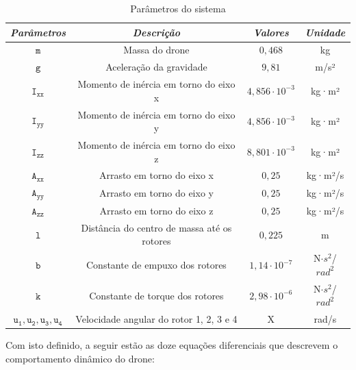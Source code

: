 \begin{center}
    \begin{longtable}{|c|c|c|c|} %
        \caption{Parâmetros do sistema} \vspace{-0.7cm}
        \label{tab:params}
        \hline
        \emph{Parâmetros} & \emph{Descrição} & \emph{Valores} & \emph{Unidade} \\
        \hline
        \endfirsthead
        \endhead

        $\mathtt{m}$ & Massa do drone & $0,468$ &kg \\ \hline
        $\mathtt{g}$ & Aceleração da gravidade & $9,81$ & m/s² \\ \hline
        $\mathtt{I_{xx}}$ & Momento de inércia em torno do eixo x & $4,856 \cdot 10^{-3}$ & kg·m² \\ \hline
        $\mathtt{I_{yy}}$ & Momento de inércia em torno do eixo y & $4,856 \cdot 10^{-3}$ & kg·m² \\ \hline
        $\mathtt{I_{zz}}$ & Momento de inércia em torno do eixo z & $8,801 \cdot 10^{-3}$ & kg·m² \\ \hline
        $\mathtt{A_{xx}}$ & Arrasto em torno do eixo x & $0,25$ & kg·m²/s \\ \hline
        $\mathtt{A_{yy}}$ & Arrasto em torno do eixo y & $0,25$ & kg·m²/s \\ \hline
        $\mathtt{A_{zz}}$ & Arrasto em torno do eixo z & $0,25$ & kg·m²/s \\ \hline
        $\mathtt{l}$ & Distância do centro de massa até os rotores & $0,225$ & m \\ \hline
        $\mathtt{b}$ & Constante de empuxo dos rotores & $1,14 \cdot 10^{-7}$ & N$\cdot s^{2}$/$rad^{2}$ \\ \hline
        $\mathtt{k}$ & Constante de torque dos rotores & $2,98 \cdot 10^{-6}$ & N$\cdot s^{2}$/$rad^{2}$ \\ \hline
        $\mathtt{u_1, u_2, u_3, u_4}$ & Velocidade angular do rotor 1, 2, 3 e 4 & X & rad/s \\ \hline
    \end{longtable}
\end{center}

\vspace{-1.5cm}

Com isto definido, a seguir estão as doze equações diferenciais que descrevem o comportamento dinâmico do drone:

\vspace{-0.2cm}

